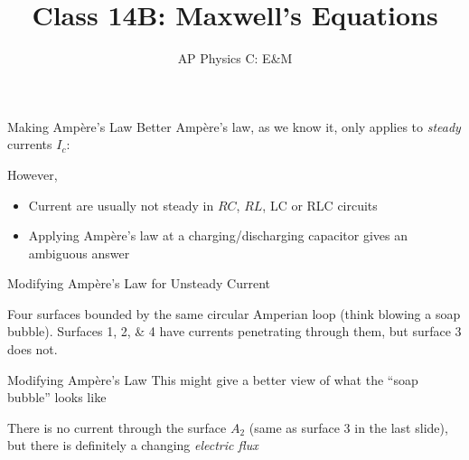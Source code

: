 \documentclass[12pt,aspectratio=169]{beamer}
\title{Class 14B: Maxwell's Equations}
\subtitle{AP Physics C: E\&M}
\begin{document}
\begin{frame}
  \maketitle
\end{frame}



\begin{frame}{Making Amp\`{e}re's Law Better}
  Amp\`{e}re's law, as we know it, only applies to \emph{steady} currents $I_c$:

  However,
  \begin{itemize}
  \item Current are usually not steady in $RC$, $RL$, LC or RLC circuits
  \item Applying Amp\`{e}re's law at a charging/discharging capacitor gives an
    ambiguous answer
  \end{itemize}
\end{frame}



\begin{frame}{Modifying Amp\`{e}re's Law for Unsteady Current}
  \begin{center}
  \end{center}
  Four surfaces bounded by the same circular Amperian loop
  (think blowing a soap bubble). Surfaces \numlist{1;2;4} have currents
  penetrating through them, but surface 3 does not.
\end{frame}



\begin{frame}{Modifying Amp\`{e}re's Law}
  This might give a better view of what the ``soap bubble'' looks like
  \begin{center}
  \end{center}
  There is no current through the surface $A_2$ (same as surface \num{3} in the
  last slide), but there is definitely a changing \emph{electric flux}
\end{frame}
\end{document}

